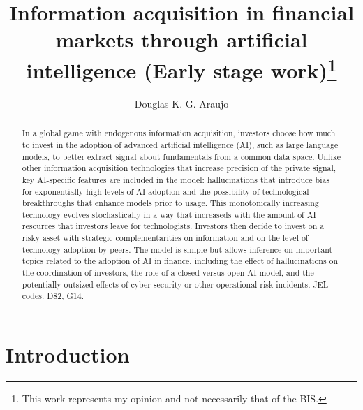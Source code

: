 \documentclass[
]{article}
\title{Information acquisition in financial markets through artificial
intelligence (Early stage work)\thanks{This work represents my opinion
and not necessarily that of the BIS.}}
\author{Douglas K. G. Araujo}
\affil{%
                  Bank for International
Settlements, douglas.araujo@bis.org
              }
\date{}
\theoremstyle{plain}
\theoremstyle{definition}
\theoremstyle{remark}
\begin{document}
\maketitle
\begin{abstract}
In a global game with endogenous information acquisition, investors
choose how much to invest in the adoption of advanced artificial
intelligence (AI), such as large language models, to better extract
signal about fundamentals from a common data space. Unlike other
information acquisition technologies that increase precision of the
private signal, key AI-specific features are included in the model:
hallucinations that introduce bias for exponentially high levels of AI
adoption and the possibility of technological breakthroughs that enhance
models prior to usage. This monotonically increasing technology evolves
stochastically in a way that increaseds with the amount of AI resources
that investors leave for technologists. Investors then decide to invest
on a risky asset with strategic complementarities on information and on
the level of technology adoption by peers. The model is simple but
allows inference on important topics related to the adoption of AI in
finance, including the effect of hallucinations on the coordination of
investors, the role of a closed versus open AI model, and the
potentially outsized effects of cyber security or other operational risk
incidents. JEL codes: D82, G14.
\end{abstract}

\section{Introduction}\label{introduction}
\end{document}
